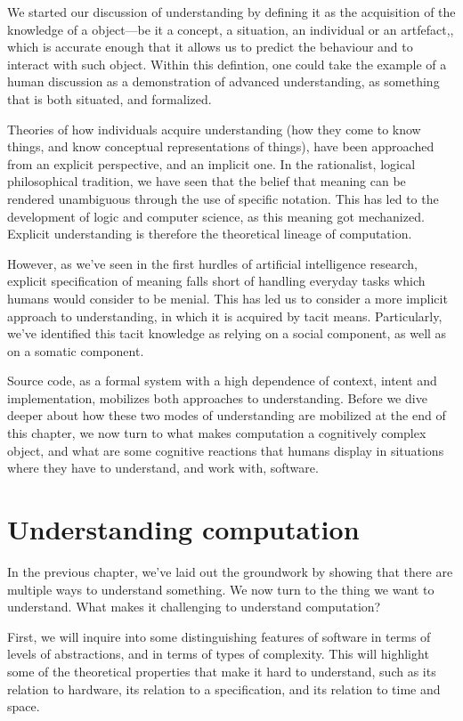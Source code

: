 We started our discussion of understanding by defining it as the acquisition of the knowledge of a object—be it a concept, a situation, an individual or an artfefact,, which is accurate enough that it allows us to predict the behaviour and to interact with such object. Within this defintion, one could take the example of a human discussion as a demonstration of advanced understanding, as something that is both situated, and formalized.

Theories of how individuals acquire understanding (how they come to know things, and know conceptual representations of things), have been approached from an explicit perspective, and an implicit one. In the rationalist, logical philosophical tradition, we have seen that the belief that meaning can be rendered unambiguous through the use of specific notation. This has led to the development of logic and computer science, as this meaning got mechanized. Explicit understanding is therefore the theoretical lineage of computation.

However, as we've seen in the first hurdles of artificial intelligence research, explicit specification of meaning falls short of handling everyday tasks which humans would consider to be menial. This has led us to consider a more implicit approach to understanding, in which it is acquired by tacit means. Particularly, we've identified this tacit knowledge as relying on a social component, as well as on a somatic component.

Source code, as a formal system with a high dependence of context, intent and implementation, mobilizes both approaches to understanding. Before we dive deeper about how these two modes of understanding are mobilized at the end of this chapter, we now turn to what makes computation a cognitively complex object, and what are some cognitive reactions that humans display in situations where they have to understand, and work with, software.

\clearpage

\section{Understanding computation}

In the previous chapter, we've laid out the groundwork by showing that there are multiple ways to understand something. We now turn to the thing we want to understand. What makes it challenging to understand computation?

First, we will inquire into some distinguishing features of software in terms of levels of abstractions, and in terms of types of complexity. This will highlight some of the theoretical properties that make it hard to understand, such as its relation to hardware, its relation to a specification, and its relation to time and space.

